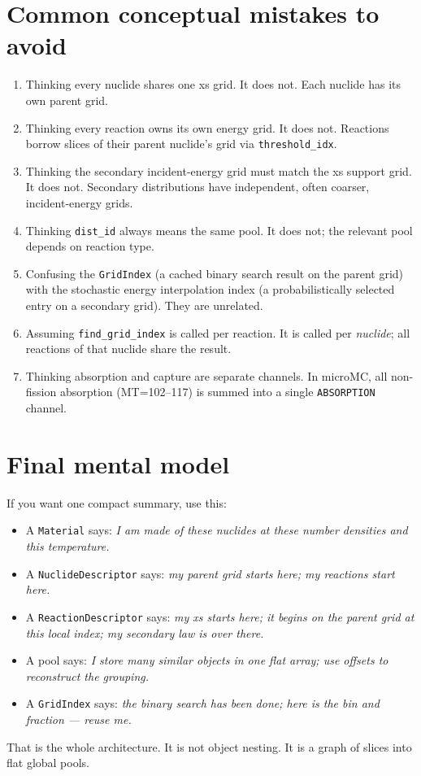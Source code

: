 \documentclass[11pt,a4paper]{article}
\begin{document}
\section{Common conceptual mistakes to avoid}
\begin{enumerate}[leftmargin=1.4em]
  \item Thinking every nuclide shares one xs grid. It does not. Each nuclide has its own parent grid.
  \item Thinking every reaction owns its own energy grid. It does not. Reactions borrow slices of their parent nuclide's grid via \texttt{threshold\_idx}.
  \item Thinking the secondary incident-energy grid must match the xs support grid. It does not. Secondary distributions have independent, often coarser, incident-energy grids.
  \item Thinking \texttt{dist\_id} always means the same pool. It does not; the relevant pool depends on reaction type.
  \item Confusing the \texttt{GridIndex} (a cached binary search result on the parent grid) with the stochastic energy interpolation index (a probabilistically selected entry on a secondary grid). They are unrelated.
  \item Assuming \texttt{find\_grid\_index} is called per reaction. It is called per \emph{nuclide}; all reactions of that nuclide share the result.
  \item Thinking absorption and capture are separate channels. In microMC, all non-fission absorption (MT=102--117) is summed into a single \texttt{ABSORPTION} channel.
\end{enumerate}

\section{Final mental model}
If you want one compact summary, use this:
\begin{itemize}[leftmargin=1.4em]
  \item A \texttt{Material} says: \emph{I am made of these nuclides at these number densities and this temperature.}
  \item A \texttt{NuclideDescriptor} says: \emph{my parent grid starts here; my reactions start here.}
  \item A \texttt{ReactionDescriptor} says: \emph{my xs starts here; it begins on the parent grid at this local index; my secondary law is over there.}
  \item A pool says: \emph{I store many similar objects in one flat array; use offsets to reconstruct the grouping.}
  \item A \texttt{GridIndex} says: \emph{the binary search has been done; here is the bin and fraction --- reuse me.}
\end{itemize}
That is the whole architecture. It is not object nesting. It is a graph of slices into flat global pools.
\end{document}
